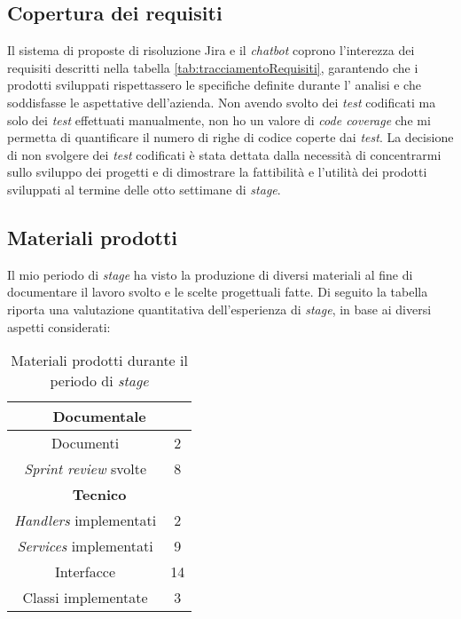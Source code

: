  \subsection{Copertura dei requisiti}
Il sistema di proposte di risoluzione Jira e il \textit{chatbot} coprono l'interezza dei requisiti descritti nella tabella \ref{tab:tracciamentoRequisiti}, garantendo che i prodotti sviluppati rispettassero le specifiche definite durante l' analisi e che soddisfasse le aspettative dell'azienda. Non avendo svolto dei \textit{test} codificati ma solo dei \textit{test} effettuati manualmente, non ho un valore di \textit{code coverage} che mi permetta di quantificare il numero di righe di codice coperte dai \textit{test}. La decisione di non svolgere dei \textit{test} codificati è stata dettata dalla necessità di concentrarmi sullo sviluppo dei progetti e di dimostrare la fattibilità e l'utilità dei prodotti sviluppati al termine delle otto settimane di \textit{stage}.

\subsection{Materiali prodotti}
Il mio periodo di \textit{stage} ha visto la produzione di diversi materiali al fine di documentare il lavoro svolto e le scelte progettuali fatte.
Di seguito la tabella riporta una valutazione quantitativa dell'esperienza di \textit{stage}, in base ai diversi aspetti considerati:
\begin{table}[H]
    \centering
    \begin{tabular}{|c|c|}
        \hline
        \multicolumn{2}{|c|}{\textbf{Documentale}} \\
        \hline
        Documenti & 2 \\
        \hline
        \textit{Sprint review} svolte & 8 \\
        \hline
        \multicolumn{2}{|c|}{\textbf{Tecnico}} \\
        \hline
        \textit{Handlers} implementati & 2 \\
        \hline
        \textit{Services} implementati & 9 \\
        \hline
        Interfacce & 14 \\
        \hline
        Classi implementate & 3 \\
        \hline
    \end{tabular}
    \caption{Materiali prodotti durante il periodo di \textit{stage}}
    \label{tab:quantitaMateriali}
\end{table}

